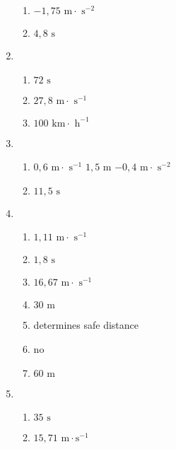 \begin{multicols}{3}
\begin{enumerate}[noitemsep, label=\textbf{(\arabic*)} ]
\begin{enumerate}[noitemsep, label=\textbf{(\alph*)} ]
 \item $-1,75 \text{ m} \cdot \text{ s}^{-2}$
\item $4,8 \text{ s}$
\end{enumerate}
\item 
\begin{enumerate}[noitemsep, label=\textbf{(\alph*)} ]
 \item $72 \text{ s}$
\item $27,8 \text{ m} \cdot \text{ s}^{-1}$
\item $100 \text{ km} \cdot \text{ h}^{-1}$
\end{enumerate}
\item 
\begin{enumerate}[noitemsep, label=\textbf{(\alph*)} ]
 \item $0,6 \text{ m} \cdot \text{ s}^{-1}$ $1,5 \text{ m}$ $-0,4 \text{ m} \cdot \text{ s}^{-2}$
\item $11,5 \text{ s}$
\end{enumerate}
\item 
\begin{enumerate}[noitemsep, label=\textbf{(\alph*)} ]
 \item $1,11 \text{ m} \cdot \text{ s}^{-1}$
\item $1,8 \text{ s}$
\item $16,67 \text{ m} \cdot \text{ s}^{-1}$
\item $30 \text{ m}$
 \item determines safe distance
\item no
\item $60 \text{ m}$
\end{enumerate}
\item 
\begin{enumerate}[noitemsep, label=\textbf{(\alph*)} ]
 \item $35 \text{ s}$
\item $15,71 \text{ m}\cdot\text{s}^{-1}$
\end{enumerate}
 \end{enumerate}
\end{multicols}

